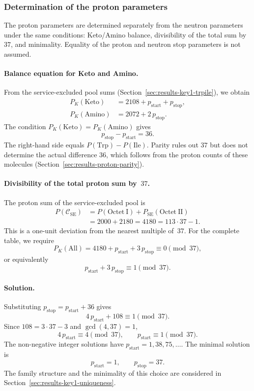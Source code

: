 \documentclass[11pt,a4paper]{article}
\renewcommand{\_}{\origunderscore\allowbreak}
\begin{document}
\subsubsection{Determination of the proton parameters}
\label{sec:results-key1-protons}

The proton parameters are determined separately from the
neutron parameters under the same conditions: Keto/Amino
balance, divisibility of the total sum by~$37$, and minimality.
Equality of the proton and neutron stop parameters is not assumed.

\paragraph{Balance equation for Keto and Amino.}
From the service-excluded pool sums
(Section~\ref{sec:results-key1-trpile}), we obtain
\begin{align*}
P_K(\mathrm{Keto}) &= 2108+p_{\text{start}}+p_{\text{stop}},\\
P_K(\mathrm{Amino}) &= 2072+2\,p_{\text{stop}}.
\end{align*}
The condition $P_K(\mathrm{Keto})=P_K(\mathrm{Amino})$ gives
\[
p_{\text{stop}}-p_{\text{start}}=36.
\]
The right-hand side equals $P(\mathrm{Trp})-P(\mathrm{Ile})$.
Parity rules out $37$ but does not determine the actual
difference $36$, which follows from the proton counts of
these molecules (Section~\ref{sec:results-proton-parity}).

\paragraph{Divisibility of the total proton sum by~$37$.}
The proton sum of the service-excluded pool is
\[
\begin{aligned}
P(\mathcal{C}_{\mathrm{SE}})
&=P(\mathrm{Octet~I})+P_{\mathrm{SE}}(\mathrm{Octet~II})\\
&=2000+2180=4180=113\cdot37-1.
\end{aligned}
\]
This is a one-unit deviation from the nearest multiple of~$37$.
For the complete table, we require
\[
P_K(\mathrm{All})=
4180+p_{\text{start}}+3\,p_{\text{stop}}
\equiv0\pmod{37},
\]
or equivalently
\[
p_{\text{start}}+3\,p_{\text{stop}}\equiv1\pmod{37}.
\]

\paragraph{Solution.}
Substituting $p_{\text{stop}}=p_{\text{start}}+36$ gives
\[
4\,p_{\text{start}}+108\equiv1\pmod{37}.
\]
Since $108=3\cdot37-3$ and $\gcd(4,37)=1$,
\[
4\,p_{\text{start}}\equiv4\pmod{37},
\qquad p_{\text{start}}\equiv1\pmod{37}.
\]
The non-negative integer solutions have
$p_{\text{start}}=1,38,75,\ldots$.
The minimal solution is
\[
p_{\text{start}}=1,\qquad p_{\text{stop}}=37.
\]
The family structure and the minimality of this choice are
considered in Section~\ref{sec:results-key1-uniqueness}.
\end{document}
